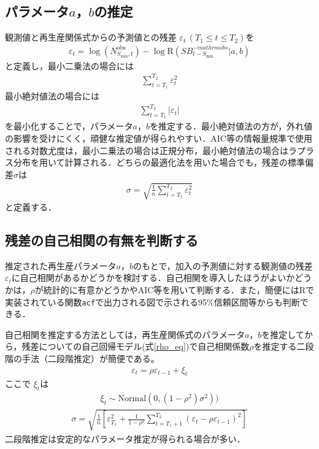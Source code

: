 \documentclass[11pt]{jsarticle}
\begin{document}
\subsection{パラメータ$a$，$b$の推定\label{estab}}
観測値と再生産関係式からの予測値との残差 $\varepsilon_t \, (T_1 \leq t \leq T_2)$を
\begin{eqnarray}
  \varepsilon_t = \log (N_{S_{\mathrm{min}},t}^{\mathrm{obs}}) - \log \mathrm{R}(S\!B_{t-S_{\mathrm{min}}}^{-mathrm{obs}}|a,b)
\end{eqnarray}
と定義し，最小二乗法の場合には
\begin{eqnarray}
  \sum_{t=T_1}^{T_2} \varepsilon_t^2
\end{eqnarray}
最小絶対値法の場合には
\begin{eqnarray}
  \sum_{t=T_1}^{T_2} | \varepsilon_t |
\end{eqnarray}
を最小化することで，パラメータ$a$，$b$を推定する．最小絶対値法の方が，外れ値の影響を受けにくく，頑健な推定値が得られやすい．AIC等の情報量規準で使用される対数尤度は，最小二乗法の場合は正規分布，最小絶対値法の場合はラプラス分布を用いて計算される．どちらの最適化法を用いた場合でも，残差の標準偏差$\sigma$は
\begin{eqnarray}
  \sigma = \sqrt{\frac{1}{n} \sum_{t=T_1}^{T_2} \varepsilon_t^2}
\end{eqnarray}
と定義する．

\subsection{残差の自己相関の有無を判断する\label{estrho}}
推定された再生産パラメータ$a$，$b$のもとで，加入の予測値に対する観測値の残差$\varepsilon_t$に自己相関があるかどうかを検討する．自己相関を導入したほうがよいかどうかは，$\rho$が統計的に有意かどうかやAIC等を用いて判断する．また，簡便にはR\cite{R}で実装されている関数\verb|acf|で出力される図で示される95\%信頼区間等からも判断できる．

自己相関を推定する方法としては，再生産関係式のパラメータ$a$，$b$を推定してから，残差についての自己回帰モデル(式\ref{rho_eq})で自己相関係数$\rho$を推定する二段階の手法（二段階推定）が簡便である。
\begin{eqnarray}
  \varepsilon_t = \rho \varepsilon_{t-1} + \xi_t
  \label{rho_eq}
\end{eqnarray}
ここで $\xi_t$は
\begin{eqnarray}
  \xi_t \sim \mathrm{Normal}(0, (1-\rho^2) \sigma^2))　
\end{eqnarray}
\begin{eqnarray}
  \sigma= \sqrt{ \frac{1}{n} \left[ \varepsilon_{T_1}^2 + \frac{1}{1-\rho^2} \sum_{t=T_1+1}^{T_2} (\varepsilon_t-\rho \varepsilon_{t-1})^2 \right]}
\end{eqnarray}
二段階推定は安定的なパラメータ推定が得られる場合が多い．
\end{document}
